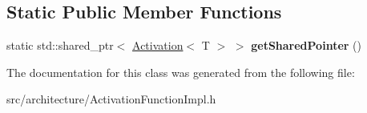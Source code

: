 \subsection*{Static Public Member Functions}
\begin{DoxyCompactItemize}
\item 
\mbox{\label{classReluActivation_aca0a050b77f06ba6ba8fb57b93ba9d90}} 
static std\+::shared\+\_\+ptr$<$ \hyperlink{classActivation}{Activation}$<$ T $>$ $>$ {\bfseries get\+Shared\+Pointer} ()
\end{DoxyCompactItemize}


The documentation for this class was generated from the following file\+:\begin{DoxyCompactItemize}
\item 
src/architecture/Activation\+Function\+Impl.\+h\end{DoxyCompactItemize}
